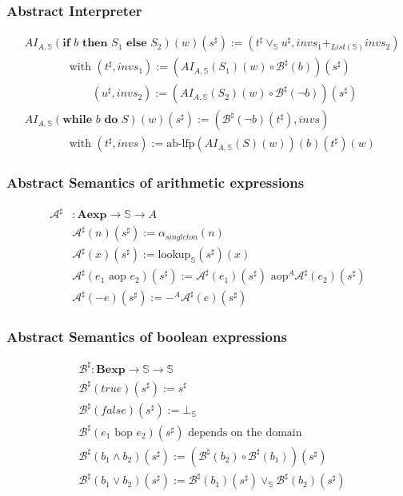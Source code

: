 \documentclass[aspectratio=169]{beamer}
\begin{document}
\begin{frame}
    \frametitle{Abstract Interpreter}
\begin{align*}
&AI_{A, \mathbb{S}} (\textbf {if } b \textbf { then } S_1 \textbf { else } S_2) (w) (s^{\sharp}) := (t^{\sharp} \vee_{\mathbb{S}} u^{\sharp}, invs_1 +_{List(\mathbb{S})} invs_2) \\
& \qquad \qquad \text{with } (t^{\sharp}, invs_1) := (AI_{A, \mathbb{S}} ( S_1 ) (w) \circ \mathcal{B}^{\sharp} ( b )) (s^{\sharp}) \\
& \qquad \qquad \qquad (u^{\sharp}, invs_2) := (AI_{A, \mathbb{S}} ( S_2 ) (w) \circ \mathcal{B}^{\sharp} ( \neg b )) (s^{\sharp}) \\
&AI_{A, \mathbb{S}} (\textbf {while } b \textbf { do } S) (w) (s^{\sharp}) := (\mathcal{B}^{\sharp} ( \neg b ) (t^{\sharp}), invs)\\
& \qquad \qquad \text{with } (t^{\sharp}, invs) := \text{ab-lfp} (AI_{A, \mathbb{S}} ( S ) (w)) (b) (t^{\sharp}) (w)
\end{align*}
\end{frame}


\begin{frame}
    \frametitle{Abstract Semantics of arithmetic expressions}
    \begin{align*} 
     \mathcal{A}^{\sharp} &: \mathbf{A e x p} \rightarrow \mathbb{S} \rightarrow A \\
    & \mathcal{A}^{\sharp}(n)(s^{\sharp}) := \alpha_{singleton}(n)\\
    & \mathcal{A}^{\sharp} (x) (s^{\sharp}) := \text{lookup}_\mathbb{S}(s^{\sharp})(x) \\
    & \mathcal{A}^{\sharp} ( e_1 \text{ aop } e_2 ) (s^{\sharp}) := \mathcal{A}^{\sharp} (e_1) (s^{\sharp}) \text{ aop}^A \mathcal{A}^{\sharp} (e_2) (s^{\sharp})\\
    & \mathcal{A}^{\sharp} ( -e ) (s^{\sharp}) := -^A \mathcal{A}^{\sharp} (e) (s^{\sharp})
\end{align*}
\end{frame}

\begin{frame}
    \frametitle{Abstract Semantics of boolean expressions}
    \begin{align*} 
    & \mathcal{B}^{\sharp}: \mathbf{B e x p} \rightarrow \mathbb{S} \rightarrow \mathbb{S} \\
    & \mathcal{B}^{\sharp} (true) (s^{\sharp}) := s^{\sharp} \\
    & \mathcal{B}^{\sharp} (false) (s^{\sharp}) := \bot_\mathbb{S} \\
    & \mathcal{B}^{\sharp} ( e_1 \text{ bop } e_2 ) (s^{\sharp}) \text{ depends on the domain} \\
    & \mathcal{B}^{\sharp} ( b_1 \land b_2 ) (s^{\sharp}) := (\mathcal{B}^{\sharp} ( b_2 ) \circ \mathcal{B}^{\sharp} ( b_1 )) (s^{\sharp}) \\
    & \mathcal{B}^{\sharp} ( b_1 \lor b_2 ) (s^{\sharp}) := \mathcal{B}^{\sharp} ( b_1) (s^{\sharp}) \vee_\mathbb{S} \mathcal{B}^{\sharp} ( b_2) (s^{\sharp})
\end{align*}
\end{frame}
\end{document}
